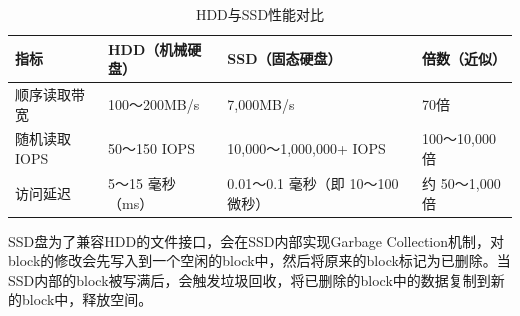 \begin{table}[H]
    \centering
    \caption{HDD与SSD性能对比}
    \label{tab:2-hdd-ssd-comparison}
    \begin{tabularx}{\linewidth}{lXXX}
        \toprule
        \textbf{指标} & \textbf{HDD（机械硬盘）} & \textbf{SSD（固态硬盘）} & \textbf{倍数（近似）} \\
        \midrule
        顺序读取带宽 &
        \begin{minipage}[t]{\linewidth}
            100～200MB/s
        \end{minipage} &
        \begin{minipage}[t]{\linewidth}
            7,000MB/s
        \end{minipage} &
        \begin{minipage}[t]{\linewidth}
            70倍
        \end{minipage} \\

        随机读取 IOPS &
        \begin{minipage}[t]{\linewidth}
            50～150 IOPS
        \end{minipage} &
        \begin{minipage}[t]{\linewidth}
            10,000～1,000,000+ IOPS
        \end{minipage} &
        \begin{minipage}[t]{\linewidth}
            100～10,000 倍
        \end{minipage} \\

        访问延迟 &
        \begin{minipage}[t]{\linewidth}
            5～15 毫秒（ms）
        \end{minipage} &
        \begin{minipage}[t]{\linewidth}
            0.01～0.1 毫秒（即 10～100 微秒）
        \end{minipage} &
        \begin{minipage}[t]{\linewidth}
            约 50～1,000 倍
        \end{minipage} \\
        \bottomrule
    \end{tabularx}
\end{table}

SSD盘为了兼容HDD的文件接口，会在SSD内部实现Garbage Collection机制，对block的修改会先写入到一个空闲的block中，然后将原来的block标记为已删除。当SSD内部的block被写满后，会触发垃圾回收，将已删除的block中的数据复制到新的block中，释放空间。

